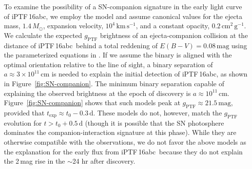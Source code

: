 \documentclass[twocolumn]{aastex61}
\newcommand{\sm}{M_\odot}
\newcommand{\abc}{iPTF\,16abc}
\begin{document}
To examine the possibility of a SN-companion signature in the early light
curve of \abc, we employ the \citet{2010ApJ...708.1025K} model and assume
canonical values for the ejecta mass, $1.4\,\sm$, expansion velocity,
$10^{4}\,\textrm{km}\,\textrm{s}^{-1}$, and a constant opacity,
$0.2\,\textrm{cm}^2\,\textrm{g}^{-1}$. We calculate the expected
$g_\mathrm{PTF}$ brightness of an ejecta-companion collision at the distance
of \abc\ behind a total reddening of $E(B-V) = 0.08 \, \mathrm{mag}$ using the
parameterized equations in \citet{2012ApJ...749...18B}. If we assume the
binary is aligned with the optimal orientation relative to the line of sight,
a binary separation of $a \approx 3 \times 10^{11}\, \mathrm{cm}$ is needed to
explain the initial detection of \abc, as shown in
Figure~\ref{fig:SN-companion}. The minimum binary separation capable of
explaining the observed brightness at the epoch of discovery is $a \approx
10^{11} \, \mathrm{cm}$. Figure~\ref{fig:SN-companion} shows that such models
peak at $g_\mathrm{PTF} \approx 21.5 \, \mathrm{mag}$, provided that
$t_\mathrm{exp} \approx t_0 - 0.3 \, \mathrm{d}$. These models do not,
however, match the $g_\mathrm{PTF}$ evolution for $t > t_0 + 0.5 \,
\mathrm{d}$ (though it is possible that the SN photosphere dominates the
companion-interaction signature at this phase). While they are otherwise
compatible with the observations, we do not favor the above models as the
explanation for the early flux from \abc\ because they do not explain the
2\,mag rise in the $\sim$24 hr after discovery.
\end{document}
